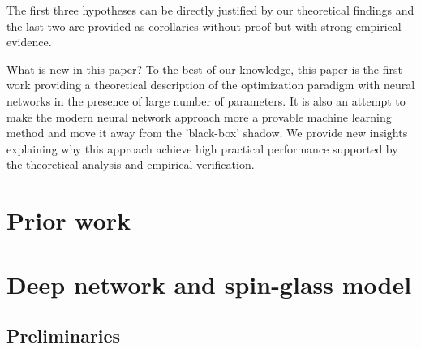 \documentclass[twoside]{article}
\begin{document}
\vspace{-0.05in}
The first three hypotheses can be directly justified by our theoretical findings and the last two are provided as corollaries without proof but with strong empirical evidence.

What is new in this paper? To the best of our knowledge, this paper is the first work providing a theoretical description of the optimization paradigm with neural networks in the presence of large number of parameters. It is also an attempt to make the modern neural network approach more a provable machine learning method and move it away from the 'black-box' shadow. We provide new insights explaining why this approach achieve high practical performance supported by the theoretical analysis and empirical verification.

\section{Prior work}
\label{sec:PriorWork}




\section{Deep network and spin-glass model}
\label{sec:NNSG}

\subsection{Preliminaries}
\end{document}
